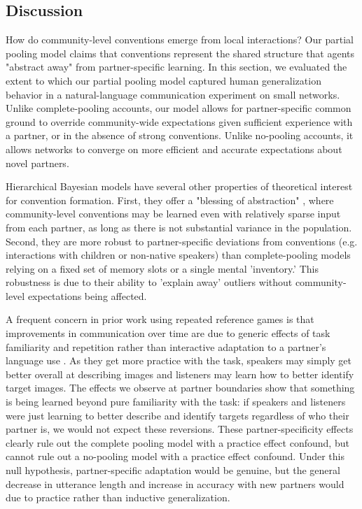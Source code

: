 \subsection{Discussion}

How do community-level conventions emerge from local interactions? 
Our partial pooling model claims that conventions represent the shared structure that agents "abstract away" from partner-specific learning.
In this section, we evaluated the extent to which our partial pooling model captured human generalization behavior in a natural-language communication experiment on small networks.
Unlike complete-pooling accounts, our model allows for partner-specific common ground to override community-wide expectations given sufficient experience with a partner, or in the absence of strong conventions.
Unlike no-pooling accounts, it allows networks to converge on more efficient and accurate expectations about novel partners.

Hierarchical Bayesian models have several other properties of theoretical interest for convention formation.
First, they offer a "blessing of abstraction" \cite{GoodmanUllmanTenenbaum11_TheoryOfCausality}, where community-level conventions may be learned even with relatively sparse input from each partner, as long as there is not substantial variance in the population. 
Second, they are more robust to partner-specific deviations from conventions (e.g. interactions with children or non-native speakers) than complete-pooling models relying on a fixed set of memory slots or a single mental 'inventory.' 
This robustness is due to their ability to 'explain away' outliers without community-level expectations being affected. 

A frequent concern in prior work using repeated reference games is that improvements in communication over time are due to generic effects of task familiarity and repetition rather than interactive adaptation to a partner's language use \cite{HupetChantraine92_CollaborationOrRepitition}.
As they get more practice with the task, speakers may simply get better overall at describing images and listeners may learn how to better identify target images. 
The effects we observe at partner boundaries show that something is being learned beyond pure familiarity with the task: if speakers and listeners were just learning to better describe and identify targets regardless of who their partner is, we would not expect these reversions.
These partner-specificity effects clearly rule out the complete pooling model with a practice effect confound, but cannot rule out a no-pooling model with a practice effect confound.
Under this null hypothesis, partner-specific adaptation would be genuine, but the general decrease in utterance length and increase in accuracy with new partners would due to practice rather than inductive generalization.

